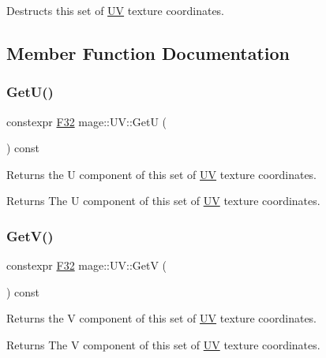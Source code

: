 Destructs this set of \mbox{\hyperlink{structmage_1_1_u_v}{UV}} texture coordinates. 

\subsection{Member Function Documentation}
\mbox{\label{structmage_1_1_u_v_a8587903b07cab58428d01ed9ded97dd4}} 
\subsubsection{\texorpdfstring{Get\+U()}{GetU()}}
{\footnotesize\ttfamily constexpr \mbox{\hyperlink{namespacemage_aa97e833b45f06d60a0a9c4fc22ae02c0}{F32}} mage\+::\+U\+V\+::\+GetU (\begin{DoxyParamCaption}{ }\end{DoxyParamCaption}) const\hspace{0.3cm}{\ttfamily [noexcept]}}

Returns the U component of this set of \mbox{\hyperlink{structmage_1_1_u_v}{UV}} texture coordinates.

\begin{DoxyReturn}{Returns}
The U component of this set of \mbox{\hyperlink{structmage_1_1_u_v}{UV}} texture coordinates. 
\end{DoxyReturn}
\mbox{\label{structmage_1_1_u_v_a95b38718cb3eeaacebdfa306b4921d90}} 
\subsubsection{\texorpdfstring{Get\+V()}{GetV()}}
{\footnotesize\ttfamily constexpr \mbox{\hyperlink{namespacemage_aa97e833b45f06d60a0a9c4fc22ae02c0}{F32}} mage\+::\+U\+V\+::\+GetV (\begin{DoxyParamCaption}{ }\end{DoxyParamCaption}) const\hspace{0.3cm}{\ttfamily [noexcept]}}

Returns the V component of this set of \mbox{\hyperlink{structmage_1_1_u_v}{UV}} texture coordinates.

\begin{DoxyReturn}{Returns}
The V component of this set of \mbox{\hyperlink{structmage_1_1_u_v}{UV}} texture coordinates. 
\end{DoxyReturn}
\mbox{\label{structmage_1_1_u_v_a90eed8d6fd280be4fb82c3ae389b50d1}} 
